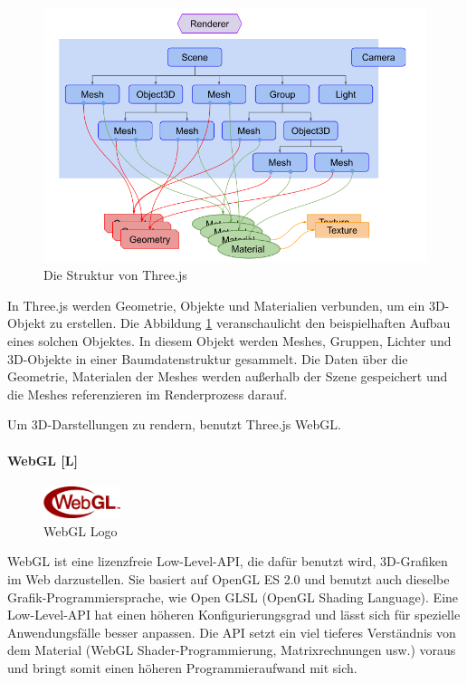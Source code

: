 \begin{figure} [h t]
  \centering
  \includegraphics[scale=0.5]{pics/threejs-structure.png}
  \caption{Die Struktur von Three.js \cite{ThreeJsFund}}
  \label{fig:tech:front:threejsstructure}
\end{figure}

In Three.js werden Geometrie, Objekte und Materialien verbunden, um ein 3D-Objekt zu erstellen. 
Die Abbildung \ref{fig:tech:front:threejsstructure} veranschaulicht den beispielhaften Aufbau eines solchen Objektes. In diesem Objekt werden Meshes, Gruppen, Lichter und 3D-Objekte in einer Baumdatenstruktur gesammelt. Die Daten über die Geometrie, Materialen der Meshes werden außerhalb der Szene gespeichert und die Meshes referenzieren im Renderprozess darauf. \cite[Three.js fundamentals]{ThreeJsFund}

\label{ch::ThreeJsDependency}
Um 3D-Darstellungen zu rendern, benutzt Three.js WebGL.

\paragraph{WebGL [L]}
\label{ch::webgl}
\begin{figure}
    \begin{center}
      \includegraphics[width=0.2\textwidth]{pics/WebGL_Logo.png}
     \caption{WebGL Logo}
    \end{center}
\end{figure}
WebGL ist eine lizenzfreie Low-Level-API, die dafür benutzt wird, 3D-Grafiken im Web darzustellen. Sie basiert auf OpenGL ES 2.0 und benutzt auch dieselbe Grafik-Programmiersprache, wie Open GLSL (OpenGL Shading Language). Eine Low-Level-API hat einen höheren Konfigurierungsgrad und lässt sich für spezielle Anwendungsfälle besser anpassen. Die API setzt ein viel tieferes Verständnis von dem Material (WebGL Shader-Programmierung, Matrixrechnungen usw.) voraus und bringt somit einen höheren Programmieraufwand mit sich. \cite{WebglGettingStarted, HighlowAPI}

